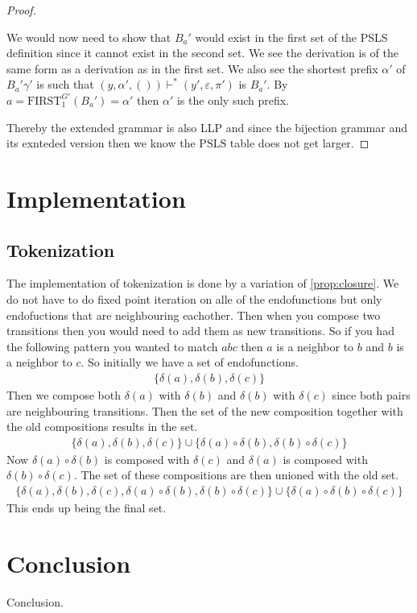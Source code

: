 \documentclass[a4paper,12pt]{article}
\newcommand\PSLS{\text{PSLS}}
\theoremstyle{definition}
\begin{document}
\begin{proof}
\begin{itemize}
    We would now need to show that $B_a'$ would exist in the first set of the PSLS definition since it cannot exist in the second set. We see the derivation is of the same form as a derivation as in the first set. We also see the shortest prefix $\alpha'$ of $B_a'\gamma'$ is such that $(y, \alpha', ()) \vdash^* (y', \varepsilon, \pi')$ is $B_a'$. By $a = \text{FIRST}^{G'}_1(B_a') = \alpha'$ then $\alpha'$ is the only such prefix.
  \end{itemize}
  Thereby the extended grammar is also LLP and since the bijection grammar and its exnteded version then we know the $\PSLS$ table does not get larger.
\end{proof}

\section{Implementation}
\subsection{Tokenization}
The implementation of tokenization is done by a variation of \ref{prop:closure}. We do not have to do fixed point iteration on alle of the endofunctions but only endofuctions that are neighbouring eachother. Then when you compose two transitions then you would need to add them as new transitions. So if you had the following pattern you wanted to match $abc$ then $a$ is a neighbor to $b$ and $b$ is a neighbor to $c$. So initially we have a set of endofunctions.
\begin{align*}
  \{\delta(a), \delta(b), \delta(c)\}
\end{align*}
Then we compose both $\delta(a)$ with $\delta(b)$ and $\delta(b)$ with $\delta(c)$ since both pairs are neighbouring transitions. Then the set of the new composition together with the old compositions results in the set.
\begin{align*}
  \{\delta(a), \delta(b), \delta(c)\} \cup \{\delta(a) \circ \delta(b), \delta(b) \circ \delta(c)\}
\end{align*}
Now $\delta(a) \circ \delta(b)$ is composed with $\delta(c)$ and $\delta(a)$ is composed with $\delta(b) \circ \delta(c)$. The set of these compositions are then unioned with the old set.
\begin{align*}
  \{\delta(a), \delta(b), \delta(c), \delta(a) \circ \delta(b), \delta(b) \circ \delta(c)\} \cup \{\delta(a) \circ \delta(b) \circ \delta(c)\}
\end{align*}
This ends up being the final set.

\section{Conclusion}
Conclusion.
\printbibliography
\end{document}
